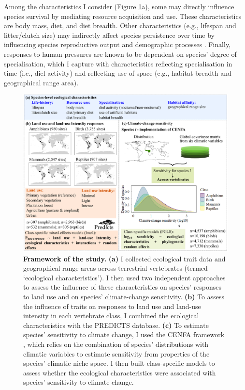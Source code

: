 Among the characteristics I consider (Figure \ref{chap4_fig1}a), some may directly influence species survival by mediating resource acquisition and use. These characteristics are body mass, diet, and diet breadth. Other characteristics (e.g., lifespan and litter/clutch size) may indirectly affect species persistence over time by influencing species reproductive output and demographic processes \citep{Capdevila2022a}. Finally, responses to human pressures are known to be dependent on species' degree of specialisation, which I capture with characteristics reflecting specialisation in time (i.e., diel activity) and reflecting use of space (e.g., habitat breadth and geographical range area). 


\clearpage

\begin{figure}
\centering
\includegraphics[scale=0.55]{figures/Chapter4/Figure1}
\caption[Framework of the study]{\textbf{Framework of the study.} \textbf{(a)} I collected ecological trait data and geographical range areas across terrestrial vertebrates (termed `ecological characteristics'). I then used two independent approaches to assess the influence of these characteristics on species' responses to land use and on species' climate-change sensitivity. \textbf{(b)} To assess the influence of traits on responses to land use and land-use intensity in each vertebrate class, I combined the ecological characteristics with the PREDICTS database. \textbf{(c)} To estimate species' sensitivity to climate change, I used the CENFA framework \citep{Rinnan2019}, which relies on the combination of species’ distributions with climatic variables to estimate sensitivity from properties of the species’ climatic niche space. I then built class-specific models to assess whether the ecological characteristics were associated with  species' sensitivity to climate change.}
\label{chap4_fig1}
\end{figure}

